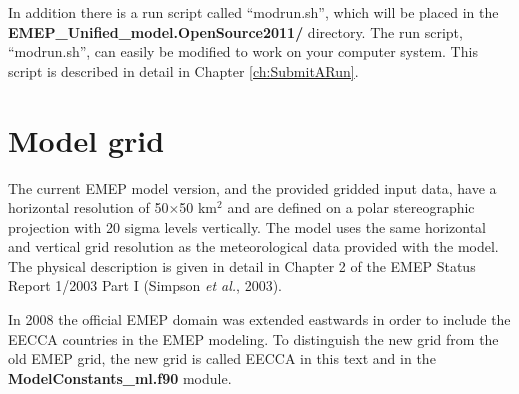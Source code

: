 In addition there is a run script called ``modrun.sh'', which will be placed 
in the \\{\bf EMEP\_Unified\_model.OpenSource2011/}  directory. The run script, 
``modrun.sh'', can easily be modified to work on your computer system. This 
script is described in detail in Chapter \ref{ch:SubmitARun}. 
 


\section{Model grid}
\label{sec:ModelGrid}

The current EMEP model version, and the provided gridded input data,
have a horizontal resolution of 50$\times$50 km$^2$ and are defined on a
polar stereographic projection with 20 sigma levels vertically. 
The model uses the same horizontal and vertical grid resolution as the 
meteorological data provided with the model. The physical
description is given in detail in Chapter 2 of the EMEP Status Report
1/2003 Part I (Simpson {\sl et al.}, 2003).

In 2008 the official EMEP domain was extended eastwards in order to include the 
EECCA countries in the EMEP modeling. To distinguish the new grid from the old EMEP 
grid, the new grid is called EECCA in this text and in the { \bf ModelConstants\_ml.f90} module.

